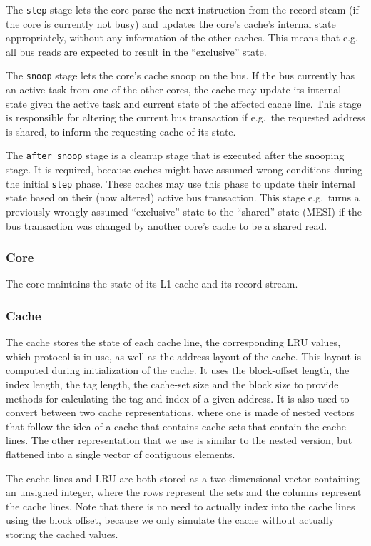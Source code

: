The \texttt{step} stage lets the core parse the next instruction from the record steam (if the core
is currently not busy) and updates the core's cache's internal state appropriately, without any
information of the other caches. This means that e.g. all bus reads are expected to result in the
``exclusive'' state.

The \texttt{snoop} stage lets the core's cache snoop on the bus.
If the bus currently has an active task from one of the other cores, the cache may update its
internal state given the active task and current state of the affected cache line. This stage is
responsible for altering the current bus transaction if e.g.\ the requested address is shared, to
inform the requesting cache of its state.

The \texttt{after\_snoop} stage is a cleanup stage that is executed after the snooping stage.
It is required, because caches might have assumed wrong conditions during the initial \texttt{step}
phase. These caches may use this phase to update their internal state based on their (now altered)
active bus transaction. This stage e.g.\ turns a previously wrongly assumed ``exclusive'' state to
the ``shared'' state (MESI) if the bus transaction was changed by another core's cache to be a
shared read.

\subsubsection{Core}
The core maintains the state of its L1 cache and its record stream.

\subsubsection{Cache}
The cache stores the state of each cache line, the corresponding LRU values, which
protocol is in use, as well as the address layout of the cache. This layout is computed during
initialization of the cache. It uses the block-offset length, the index length, the tag length,
the cache-set size and the block size to provide methods for calculating the tag and index of a
given address. It is also used to convert between two cache representations, where one is made of
nested vectors that follow the idea of a cache that contains cache sets that contain the cache
lines. The other representation that we use is similar to the nested version, but flattened into a
single vector of contiguous elements.

The cache lines and LRU are both stored as a two dimensional vector containing an unsigned integer,
where the rows represent the sets and the columns represent the cache lines. Note that there is no need
to actually index into the cache lines using the block offset, because we only simulate the cache
without actually storing the cached values.

